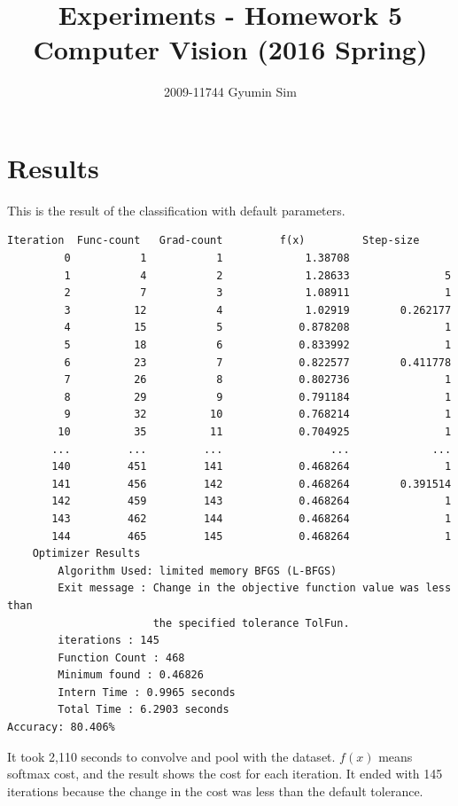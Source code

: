 \documentclass[a4paper,10pt]{article}
\begin{document}
\title{Experiments - Homework 5 \\
  \large Computer Vision (2016 Spring)}
\author{2009-11744 Gyumin Sim}
\maketitle

\section*{Results}

This is the result of the classification with default parameters.
\begin{lstlisting}[language={},frame=single,basicstyle=\small]
     Iteration  Func-count   Grad-count         f(x)         Step-size
         0           1           1             1.38708    
         1           4           2             1.28633               5
         2           7           3             1.08911               1
         3          12           4             1.02919        0.262177
         4          15           5            0.878208               1
         5          18           6            0.833992               1
         6          23           7            0.822577        0.411778
         7          26           8            0.802736               1
         8          29           9            0.791184               1
         9          32          10            0.768214               1
        10          35          11            0.704925               1
       ...         ...         ...                 ...             ...
       140         451         141            0.468264               1
       141         456         142            0.468264        0.391514
       142         459         143            0.468264               1
       143         462         144            0.468264               1
       144         465         145            0.468264               1
    Optimizer Results
        Algorithm Used: limited memory BFGS (L-BFGS)
        Exit message : Change in the objective function value was less than
                       the specified tolerance TolFun.
        iterations : 145
        Function Count : 468
        Minimum found : 0.46826
        Intern Time : 0.9965 seconds
        Total Time : 6.2903 seconds
Accuracy: 80.406%
\end{lstlisting}
It took 2,110 seconds to convolve and pool with the dataset.
$f(x)$ means softmax cost, and the result shows the cost for each iteration.
It ended with 145 iterations because the change in the cost was less than the default tolerance.
\end{document}
